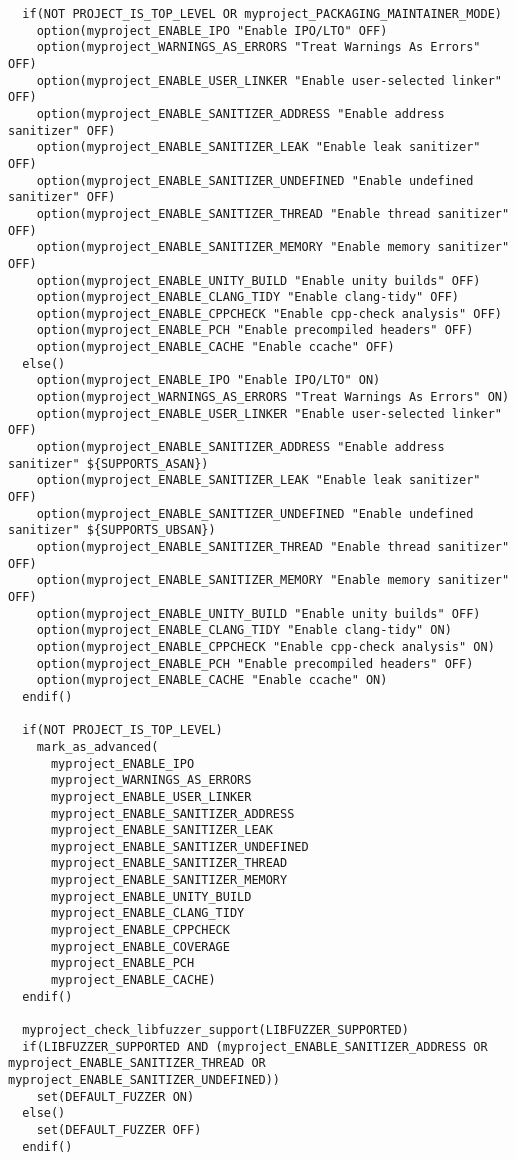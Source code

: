 \begin{verbatim}
  if(NOT PROJECT_IS_TOP_LEVEL OR myproject_PACKAGING_MAINTAINER_MODE)
    option(myproject_ENABLE_IPO "Enable IPO/LTO" OFF)
    option(myproject_WARNINGS_AS_ERRORS "Treat Warnings As Errors" OFF)
    option(myproject_ENABLE_USER_LINKER "Enable user-selected linker" OFF)
    option(myproject_ENABLE_SANITIZER_ADDRESS "Enable address sanitizer" OFF)
    option(myproject_ENABLE_SANITIZER_LEAK "Enable leak sanitizer" OFF)
    option(myproject_ENABLE_SANITIZER_UNDEFINED "Enable undefined sanitizer" OFF)
    option(myproject_ENABLE_SANITIZER_THREAD "Enable thread sanitizer" OFF)
    option(myproject_ENABLE_SANITIZER_MEMORY "Enable memory sanitizer" OFF)
    option(myproject_ENABLE_UNITY_BUILD "Enable unity builds" OFF)
    option(myproject_ENABLE_CLANG_TIDY "Enable clang-tidy" OFF)
    option(myproject_ENABLE_CPPCHECK "Enable cpp-check analysis" OFF)
    option(myproject_ENABLE_PCH "Enable precompiled headers" OFF)
    option(myproject_ENABLE_CACHE "Enable ccache" OFF)
  else()
    option(myproject_ENABLE_IPO "Enable IPO/LTO" ON)
    option(myproject_WARNINGS_AS_ERRORS "Treat Warnings As Errors" ON)
    option(myproject_ENABLE_USER_LINKER "Enable user-selected linker" OFF)
    option(myproject_ENABLE_SANITIZER_ADDRESS "Enable address sanitizer" ${SUPPORTS_ASAN})
    option(myproject_ENABLE_SANITIZER_LEAK "Enable leak sanitizer" OFF)
    option(myproject_ENABLE_SANITIZER_UNDEFINED "Enable undefined sanitizer" ${SUPPORTS_UBSAN})
    option(myproject_ENABLE_SANITIZER_THREAD "Enable thread sanitizer" OFF)
    option(myproject_ENABLE_SANITIZER_MEMORY "Enable memory sanitizer" OFF)
    option(myproject_ENABLE_UNITY_BUILD "Enable unity builds" OFF)
    option(myproject_ENABLE_CLANG_TIDY "Enable clang-tidy" ON)
    option(myproject_ENABLE_CPPCHECK "Enable cpp-check analysis" ON)
    option(myproject_ENABLE_PCH "Enable precompiled headers" OFF)
    option(myproject_ENABLE_CACHE "Enable ccache" ON)
  endif()

  if(NOT PROJECT_IS_TOP_LEVEL)
    mark_as_advanced(
      myproject_ENABLE_IPO
      myproject_WARNINGS_AS_ERRORS
      myproject_ENABLE_USER_LINKER
      myproject_ENABLE_SANITIZER_ADDRESS
      myproject_ENABLE_SANITIZER_LEAK
      myproject_ENABLE_SANITIZER_UNDEFINED
      myproject_ENABLE_SANITIZER_THREAD
      myproject_ENABLE_SANITIZER_MEMORY
      myproject_ENABLE_UNITY_BUILD
      myproject_ENABLE_CLANG_TIDY
      myproject_ENABLE_CPPCHECK
      myproject_ENABLE_COVERAGE
      myproject_ENABLE_PCH
      myproject_ENABLE_CACHE)
  endif()

  myproject_check_libfuzzer_support(LIBFUZZER_SUPPORTED)
  if(LIBFUZZER_SUPPORTED AND (myproject_ENABLE_SANITIZER_ADDRESS OR myproject_ENABLE_SANITIZER_THREAD OR myproject_ENABLE_SANITIZER_UNDEFINED))
    set(DEFAULT_FUZZER ON)
  else()
    set(DEFAULT_FUZZER OFF)
  endif()


\end{verbatim}
